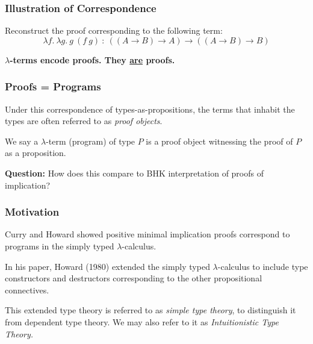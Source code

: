 \documentclass{beamer}
\theoremstyle{indentDefn} \newtheorem{defn}[]{Definition}
\begin{document}
\begin{frame}
	\frametitle{Illustration of Correspondence}
	
	Reconstruct the proof corresponding to the following term: 
	$$\lambda f. \ \lambda g. \ g \ (f \ g) \ : \ ((A \to B) \to A) \to ((A \to B) \to B)$$
	
	
	\vspace{60mm}
	
	\textbf{$\lambda$-terms encode proofs. They \underline{are} proofs.}

\end{frame}



\begin{frame}
  \frametitle{Proofs = Programs}

  Under this correspondence of types-as-propositions, the terms that inhabit the types are often referred to as \emph{proof objects}.

  We say a $\lambda$-term (program) of type $P$ is a proof object witnessing the proof of $P$ as a proposition.

  {\bf Question:} How does this compare to BHK interpretation of proofs of implication?

  \vspace{50mm}
\end{frame}

\begin{frame}
  \frametitle{Motivation}

  Curry and Howard showed positive minimal implication proofs correspond to programs in the simply typed $\lambda$-calculus. 
  
  In his paper, Howard (1980) extended the simply typed $\lambda$-calculus to include type constructors and destructors corresponding to the other propositional connectives. 

  This extended type theory is referred to as \emph{simple type theory}, to distinguish it from dependent type theory. We may also refer to it as \emph{Intuitionistic Type Theory.} 
  
  \vspace{40mm}
  
\end{frame}
\end{document}
